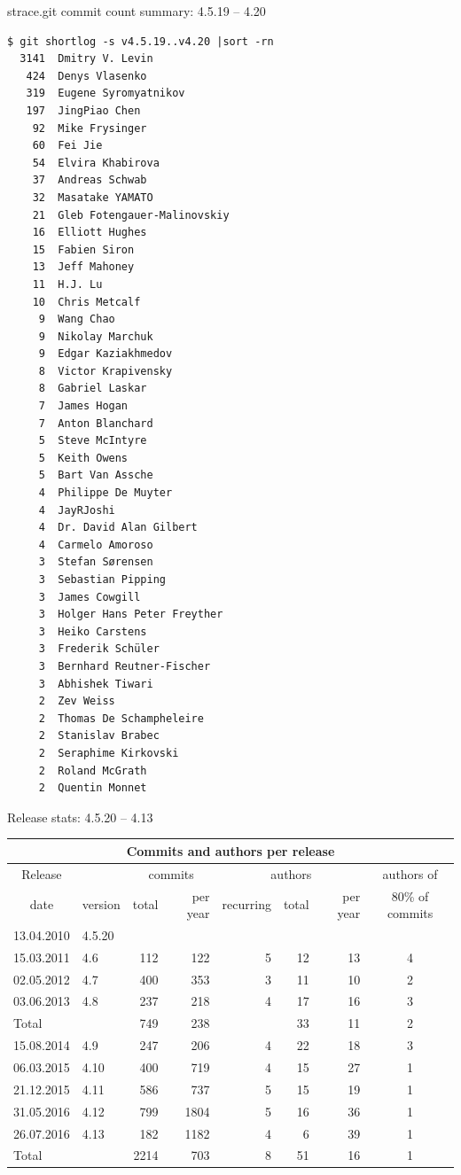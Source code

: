 \documentclass[unicode,aspectratio=169]{beamer}
\begin{document}
\begin{frame}[fragile]{strace.git commit count summary: 4.5.19 -- 4.20}
\begin{multicols}{2}
\scriptsize
\begin{verbatim}
$ git shortlog -s v4.5.19..v4.20 |sort -rn 
  3141	Dmitry V. Levin
   424	Denys Vlasenko
   319	Eugene Syromyatnikov
   197	JingPiao Chen
    92	Mike Frysinger
    60	Fei Jie
    54	Elvira Khabirova
    37	Andreas Schwab
    32	Masatake YAMATO
    21	Gleb Fotengauer-Malinovskiy
    16	Elliott Hughes
    15	Fabien Siron
    13	Jeff Mahoney
    11	H.J. Lu
    10	Chris Metcalf
     9	Wang Chao
     9	Nikolay Marchuk
     9	Edgar Kaziakhmedov
     8	Victor Krapivensky
     8	Gabriel Laskar
     7	James Hogan
     7	Anton Blanchard
     5	Steve McIntyre
     5	Keith Owens
     5	Bart Van Assche
     4	Philippe De Muyter
     4	JayRJoshi
     4	Dr. David Alan Gilbert
     4	Carmelo Amoroso
     3	Stefan Sørensen
     3	Sebastian Pipping
     3	James Cowgill
     3	Holger Hans Peter Freyther
     3	Heiko Carstens
     3	Frederik Schüler
     3	Bernhard Reutner-Fischer
     3	Abhishek Tiwari
     2	Zev Weiss
     2	Thomas De Schampheleire
     2	Stanislav Brabec
     2	Seraphime Kirkovski
     2	Roland McGrath
     2	Quentin Monnet
\end{verbatim}
\end{multicols}
\end{frame}

\begin{frame}[fragile]{Release stats: 4.5.20 -- 4.13}
\begin{tabular}{clrrrrrc}
\hline
\multicolumn{8}{c}{Commits and authors per release} \\ \hline
Release    &         & \multicolumn{2}{c}{commits}    & \multicolumn{3}{c}{authors}   & authors of \\
date       & version & total & per year & recurring & total & per year     & 80\% of commits \\ \hline
13.04.2010 & 4.5.20  &       &     &   &    &    &   \\ \hline
15.03.2011 & 4.6     & 112   & 122 & 5 & 12 & 13 & 4 \\ \hline
02.05.2012 & 4.7     & 400   & 353 & 3 & 11 & 10 & 2 \\ \hline
03.06.2013 & 4.8     & 237   & 218 & 4 & 17 & 16 & 3 \\ \hline
\multicolumn{2}{l}{Total} & 749 & 238 & & 33 & 11 & 2 \\ \hline
\hline
15.08.2014 & 4.9     & 247   &  206 & 4 & 22 & 18 & 3 \\ \hline
06.03.2015 & 4.10    & 400   &  719 & 4 & 15 & 27 & 1 \\ \hline
21.12.2015 & 4.11    & 586   &  737 & 5 & 15 & 19 & 1 \\ \hline
31.05.2016 & 4.12    & 799   & 1804 & 5 & 16 & 36 & 1 \\ \hline
26.07.2016 & 4.13    & 182   & 1182 & 4 &  6 & 39 & 1 \\ \hline
\multicolumn{2}{l}{Total} & 2214 & 703 & 8 & 51 & 16 & 1 \\ \hline
\end{tabular}
\end{frame}
\end{document}
